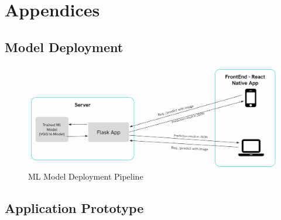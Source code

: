 \chapter{Appendices}

\section{Model Deployment}

\begin{figure}
    \centering
    \includegraphics[width=1\linewidth]{graphics//chapter9/model deployment.png}
    \caption{ML Model Deployment Pipeline}
    \label{fig:model-deployment}
\end{figure}

\section{Application Prototype}

